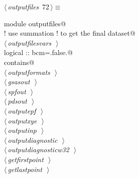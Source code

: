 \documentclass[10pt,a4paper,notitlepage]{article}
\begin{document}
\begin{flushleft} \small
\begin{minipage}{\linewidth}\label{scrap81}\raggedright\small
{} $\langle\,${\it outputfiles}\nobreak\ {\footnotesize {72}}$\,\rangle\equiv$
\vspace{-1ex}
\begin{list}{}{} \item
\mbox{}\verb@      module outputfiles@\\
\mbox{}\verb@!      use summation  ! to get the final dataset@\\
\mbox{}\verb@@\hbox{$\langle\,${\it outputfilesvars}\nobreak\ {\footnotesize {}}$\,\rangle$}\verb@@\\
\mbox{}\verb@      logical :: bcm=.false.@\\
\mbox{}\verb@      contains@\\
\mbox{}\verb@@\hbox{$\langle\,${\it outputformats}\nobreak\ {\footnotesize {}}$\,\rangle$}\verb@@\\
\mbox{}\verb@@\hbox{$\langle\,${\it gsasout}\nobreak\ {\footnotesize {}}$\,\rangle$}\verb@@\\
\mbox{}\verb@@\hbox{$\langle\,${\it spfout}\nobreak\ {\footnotesize {}}$\,\rangle$}\verb@@\\
\mbox{}\verb@@\hbox{$\langle\,${\it pdsout}\nobreak\ {\footnotesize {}}$\,\rangle$}\verb@@\\
\mbox{}\verb@@\hbox{$\langle\,${\it outputepf}\nobreak\ {\footnotesize {}}$\,\rangle$}\verb@@\\
\mbox{}\verb@@\hbox{$\langle\,${\it outputxye}\nobreak\ {\footnotesize {}}$\,\rangle$}\verb@@\\
\mbox{}\verb@@\hbox{$\langle\,${\it outputinp}\nobreak\ {\footnotesize {}}$\,\rangle$}\verb@@\\
\mbox{}\verb@@\hbox{$\langle\,${\it outputdiagnostic}\nobreak\ {\footnotesize {}}$\,\rangle$}\verb@@\\
\mbox{}\verb@@\hbox{$\langle\,${\it outputdiagnosticw32}\nobreak\ {\footnotesize {}}$\,\rangle$}\verb@@\\
\mbox{}\verb@@\hbox{$\langle\,${\it getfirstpoint}\nobreak\ {\footnotesize {}}$\,\rangle$}\verb@@\\
\mbox{}\verb@@\hbox{$\langle\,${\it getlastpoint}\nobreak\ {\footnotesize {}}$\,\rangle$}\verb@@\\

\end{list}
\end{minipage}
\end{flushleft}
\end{document}
